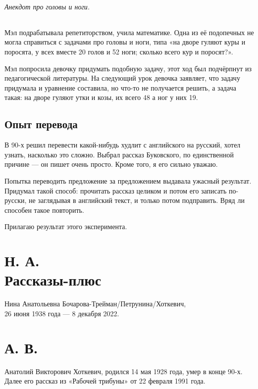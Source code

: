 \documentclass{book}
\begin{document}
\paragraph{Анекдот про головы и ноги.}
Мэл подрабатывала репетиторством, учила математике.
Одна из её подопечных не могла справиться с задачами про головы и ноги,
типа «на дворе гуляют куры и поросята, у всех вместе 20 голов и 52 ноги;
сколько всего кур и поросят?».

Мэл попросила девочку придумать подобную задачу,
этот ход был подчёрпнут из педагогической литературы.
На следующий урок девочка заявляет, что задачу придумала и уравнение составила, но что-то не получается решить,
а задача такая: на дворе гуляют утки и козы, их всего 48 а ног у них 19.

\backmatter

\chapter*{Опыт перевода}

В 90-х решил перевести какой-нибудь худлит с английского на русский, хотел узнать, насколько это сложно.
Выбрал рассказ Буковского, по единственной причине --- он пишет очень просто.
Кроме того, я его сильно уважаю.

Попытка переводить предложение за предложением выдавала ужасный результат.
Придумал такой способ: прочитать рассказ целиком и потом его записать по-русски, не заглядывая в английский текст, и только потом подправить.
Вряд ли способен такое повторить.

Прилагаю результат этого эксперимента.



\part*{Н. А.\\
Рассказы-плюс}
Нина Анатольевна Бочарова-Трейман/Петрунина/Хоткевич,\\
26 июня 1938 года --- 8 декабря 2022.




\part*{А. В.\\
}

Анатолий Викторович Хоткевич, родился 14 мая 1928 года, умер в конце 90-х.
Далее его рассказ из «Рабочей трибуны» от 22 февраля 1991 года.



\tableofcontents
\end{document}
